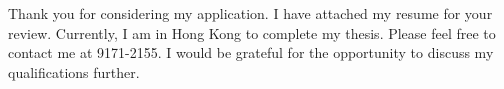 \documentclass[11pt, a4paper]{awesome-cv}
\begin{document}
\begin{cvletter}
Thank you for considering my application. I have attached my resume for your review. Currently, I am in Hong Kong to complete my thesis. Please feel free to contact me at 9171-2155. I would be grateful for the opportunity to discuss my qualifications further.

\end{cvletter}


\makeletterclosing
\end{document}

